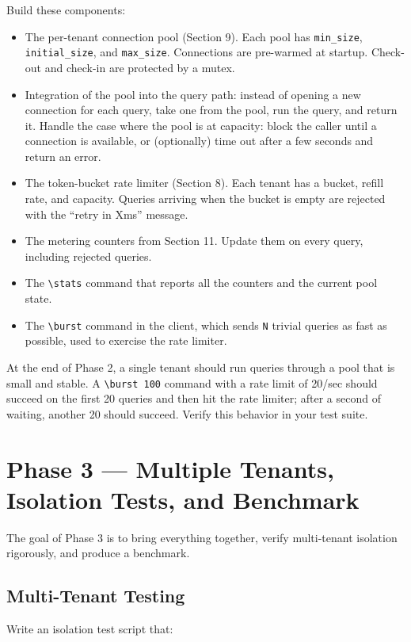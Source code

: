 \documentclass[11pt,a4paper]{article}
\begin{document}
Build these components:

\begin{itemize}
\item The per-tenant connection pool (Section 9). Each pool has \texttt{min\_size}, \texttt{initial\_size}, and \texttt{max\_size}. Connections are pre-warmed at startup. Check-out and check-in are protected by a mutex.

\item Integration of the pool into the query path: instead of opening a new connection for each query, take one from the pool, run the query, and return it. Handle the case where the pool is at capacity: block the caller until a connection is available, or (optionally) time out after a few seconds and return an error.

\item The token-bucket rate limiter (Section 8). Each tenant has a bucket, refill rate, and capacity. Queries arriving when the bucket is empty are rejected with the ``retry in Xms'' message.

\item The metering counters from Section 11. Update them on every query, including rejected queries.

\item The \verb|\stats| command that reports all the counters and the current pool state.

\item The \verb|\burst| command in the client, which sends \texttt{N} trivial queries as fast as possible, used to exercise the rate limiter.
\end{itemize}

At the end of Phase 2, a single tenant should run queries through a pool that is small and stable. A \verb|\burst 100| command with a rate limit of 20/sec should succeed on the first 20 queries and then hit the rate limiter; after a second of waiting, another 20 should succeed. Verify this behavior in your test suite.

\section{Phase 3 --- Multiple Tenants, Isolation Tests, and Benchmark}

The goal of Phase 3 is to bring everything together, verify multi-tenant isolation rigorously, and produce a benchmark.

\subsection{Multi-Tenant Testing}
Write an isolation test script that:
\end{document}
